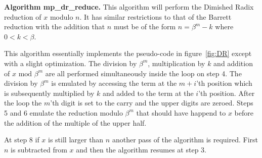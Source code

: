 \documentclass[b5paper]{book}
\begin{document}
\textbf{Algorithm mp\_dr\_reduce.}
This algorithm will perform the Dimished Radix reduction of $x$ modulo $n$.  It has similar restrictions to that of the Barrett reduction
with the addition that $n$ must be of the form $n = \beta^m - k$ where $0 < k <\beta$.  

This algorithm essentially implements the pseudo-code in figure~\ref{fig:DR} except with a slight optimization.  The division by $\beta^m$, multiplication by $k$
and addition of $x \mbox{ mod }\beta^m$ are all performed simultaneously inside the loop on step 4.  The division by $\beta^m$ is emulated by accessing
the term at the $m+i$'th position which is subsequently multiplied by $k$ and added to the term at the $i$'th position.  After the loop the $m$'th
digit is set to the carry and the upper digits are zeroed.  Steps 5 and 6 emulate the reduction modulo $\beta^m$ that should have happend to 
$x$ before the addition of the multiple of the upper half.  

At step 8 if $x$ is still larger than $n$ another pass of the algorithm is required.  First $n$ is subtracted from $x$ and then the algorithm resumes
at step 3.  
\end{document}
